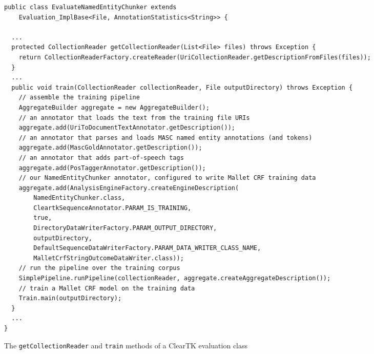 \documentclass[10pt, a4paper]{article}
\newcommand{\code}[1]{\texttt{\small #1}}
\begin{document}
\begin{figure*}
\begin{lstlisting}
public class EvaluateNamedEntityChunker extends
    Evaluation_ImplBase<File, AnnotationStatistics<String>> {

  ...
  protected CollectionReader getCollectionReader(List<File> files) throws Exception {
    return CollectionReaderFactory.createReader(UriCollectionReader.getDescriptionFromFiles(files));
  }
  ...
  public void train(CollectionReader collectionReader, File outputDirectory) throws Exception {
    // assemble the training pipeline
    AggregateBuilder aggregate = new AggregateBuilder();
    // an annotator that loads the text from the training file URIs
    aggregate.add(UriToDocumentTextAnnotator.getDescription());
    // an annotator that parses and loads MASC named entity annotations (and tokens)
    aggregate.add(MascGoldAnnotator.getDescription());
    // an annotator that adds part-of-speech tags
    aggregate.add(PosTaggerAnnotator.getDescription());
    // our NamedEntityChunker annotator, configured to write Mallet CRF training data
    aggregate.add(AnalysisEngineFactory.createEngineDescription(
        NamedEntityChunker.class,
        CleartkSequenceAnnotator.PARAM_IS_TRAINING,
        true,
        DirectoryDataWriterFactory.PARAM_OUTPUT_DIRECTORY,
        outputDirectory,
        DefaultSequenceDataWriterFactory.PARAM_DATA_WRITER_CLASS_NAME,
        MalletCrfStringOutcomeDataWriter.class));
    // run the pipeline over the training corpus
    SimplePipeline.runPipeline(collectionReader, aggregate.createAggregateDescription());
    // train a Mallet CRF model on the training data
    Train.main(outputDirectory);
  }
  ...
}
\end{lstlisting}
\caption{The \code{getCollectionReader} and \code{train} methods of a ClearTK evaluation class}
\label{fig:evaluation-code}
\end{figure*}
\end{document}
